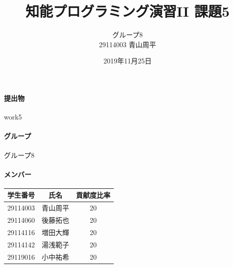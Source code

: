 \documentclass[12pt]{jarticle}
\title{知能プログラミング演習II 課題5}
\author{グループ8\\
  29114003 青山周平\\
}
\date{2019年11月25日}
\begin{document}
\maketitle

\paragraph{提出物} work5
\paragraph{グループ} グループ8
\paragraph{メンバー}
\begin{tabular}{|c|c|c|}
  \hline
  学生番号&氏名&貢献度比率\\
  \hline\hline
  29114003&青山周平&20\\
  \hline
  29114060&後藤拓也&20\\
  \hline
  29114116&増田大輝&20\\
  \hline
  29114142&湯浅範子&20\\
  \hline
  29119016&小中祐希&20\\
  \hline
\end{tabular}
\end{document}
